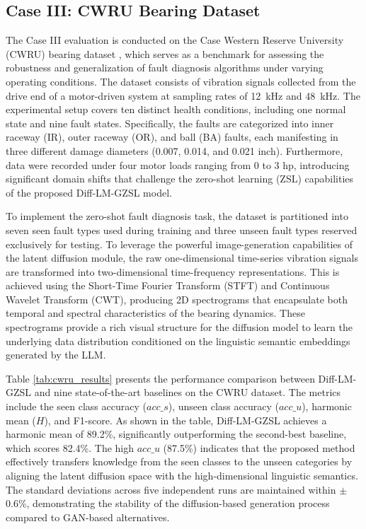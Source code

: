 \subsection{Case III: CWRU Bearing Dataset}
The Case III evaluation is conducted on the Case Western Reserve University (CWRU) bearing dataset \cite{Smith2015CWRU}, which serves as a benchmark for assessing the robustness and generalization of fault diagnosis algorithms under varying operating conditions. The dataset consists of vibration signals collected from the drive end of a motor-driven system at sampling rates of 12~kHz and 48~kHz. The experimental setup covers ten distinct health conditions, including one normal state and nine fault states. Specifically, the faults are categorized into inner raceway (IR), outer raceway (OR), and ball (BA) faults, each manifesting in three different damage diameters (0.007, 0.014, and 0.021 inch). Furthermore, data were recorded under four motor loads ranging from 0 to 3 hp, introducing significant domain shifts that challenge the zero-shot learning (ZSL) capabilities of the proposed Diff-LM-GZSL model.

To implement the zero-shot fault diagnosis task, the dataset is partitioned into seven seen fault types used during training and three unseen fault types reserved exclusively for testing. To leverage the powerful image-generation capabilities of the latent diffusion module, the raw one-dimensional time-series vibration signals are transformed into two-dimensional time-frequency representations. This is achieved using the Short-Time Fourier Transform (STFT) and Continuous Wavelet Transform (CWT), producing 2D spectrograms that encapsulate both temporal and spectral characteristics of the bearing dynamics. These spectrograms provide a rich visual structure for the diffusion model to learn the underlying data distribution conditioned on the linguistic semantic embeddings generated by the LLM.

Table \ref{tab:cwru_results} presents the performance comparison between Diff-LM-GZSL and nine state-of-the-art baselines on the CWRU dataset. The metrics include the seen class accuracy ($acc\_s$), unseen class accuracy ($acc\_u$), harmonic mean ($H$), and F1-score. As shown in the table, Diff-LM-GZSL achieves a harmonic mean of 89.2\%, significantly outperforming the second-best baseline, which scores 82.4\%. The high $acc\_u$ (87.5\%) indicates that the proposed method effectively transfers knowledge from the seen classes to the unseen categories by aligning the latent diffusion space with the high-dimensional linguistic semantics. The standard deviations across five independent runs are maintained within $\pm$0.6\%, demonstrating the stability of the diffusion-based generation process compared to GAN-based alternatives.

